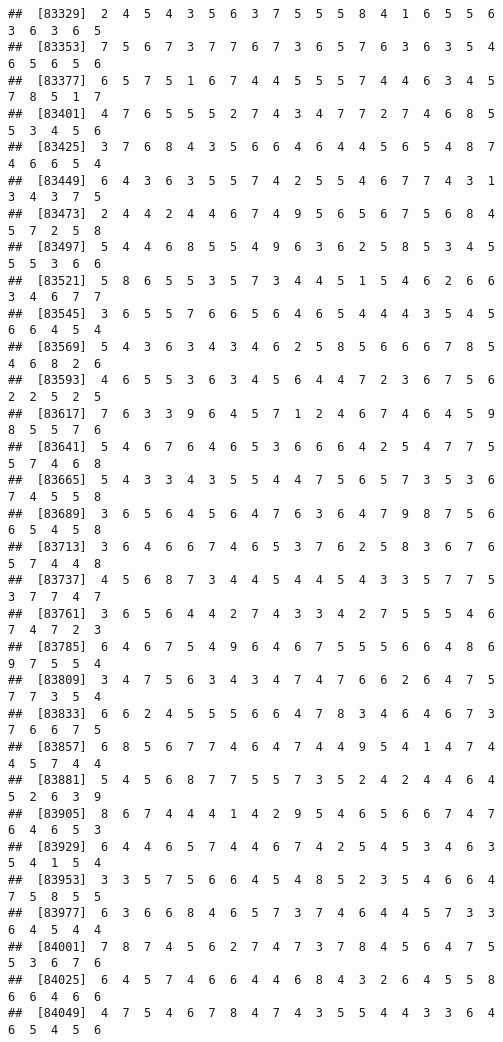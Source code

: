 \documentclass[
]{book}
\begin{document}
\begin{verbatim}
##  [83329]  2  4  5  4  3  5  6  3  7  5  5  5  8  4  1  6  5  5  6  3  6  3  6  5
##  [83353]  7  5  6  7  3  7  7  6  7  3  6  5  7  6  3  6  3  5  4  6  5  6  5  6
##  [83377]  6  5  7  5  1  6  7  4  4  5  5  5  7  4  4  6  3  4  5  7  8  5  1  7
##  [83401]  4  7  6  5  5  5  2  7  4  3  4  7  7  2  7  4  6  8  5  5  3  4  5  6
##  [83425]  3  7  6  8  4  3  5  6  6  4  6  4  4  5  6  5  4  8  7  4  6  6  5  4
##  [83449]  6  4  3  6  3  5  5  7  4  2  5  5  4  6  7  7  4  3  1  3  4  3  7  5
##  [83473]  2  4  4  2  4  4  6  7  4  9  5  6  5  6  7  5  6  8  4  5  7  2  5  8
##  [83497]  5  4  4  6  8  5  5  4  9  6  3  6  2  5  8  5  3  4  5  5  5  3  6  6
##  [83521]  5  8  6  5  5  3  5  7  3  4  4  5  1  5  4  6  2  6  6  3  4  6  7  7
##  [83545]  3  6  5  5  7  6  6  5  6  4  6  5  4  4  4  3  5  4  5  6  6  4  5  4
##  [83569]  5  4  3  6  3  4  3  4  6  2  5  8  5  6  6  6  7  8  5  4  6  8  2  6
##  [83593]  4  6  5  5  3  6  3  4  5  6  4  4  7  2  3  6  7  5  6  2  2  5  2  5
##  [83617]  7  6  3  3  9  6  4  5  7  1  2  4  6  7  4  6  4  5  9  8  5  5  7  6
##  [83641]  5  4  6  7  6  4  6  5  3  6  6  6  4  2  5  4  7  7  5  5  7  4  6  8
##  [83665]  5  4  3  3  4  3  5  5  4  4  7  5  6  5  7  3  5  3  6  7  4  5  5  8
##  [83689]  3  6  5  6  4  5  6  4  7  6  3  6  4  7  9  8  7  5  6  6  5  4  5  8
##  [83713]  3  6  4  6  6  7  4  6  5  3  7  6  2  5  8  3  6  7  6  5  7  4  4  8
##  [83737]  4  5  6  8  7  3  4  4  5  4  4  5  4  3  3  5  7  7  5  3  7  7  4  7
##  [83761]  3  6  5  6  4  4  2  7  4  3  3  4  2  7  5  5  5  4  6  7  4  7  2  3
##  [83785]  6  4  6  7  5  4  9  6  4  6  7  5  5  5  6  6  4  8  6  9  7  5  5  4
##  [83809]  3  4  7  5  6  3  4  3  4  7  4  7  6  6  2  6  4  7  5  7  7  3  5  4
##  [83833]  6  6  2  4  5  5  5  6  6  4  7  8  3  4  6  4  6  7  3  7  6  6  7  5
##  [83857]  6  8  5  6  7  7  4  6  4  7  4  4  9  5  4  1  4  7  4  4  5  7  4  4
##  [83881]  5  4  5  6  8  7  7  5  5  7  3  5  2  4  2  4  4  6  4  5  2  6  3  9
##  [83905]  8  6  7  4  4  4  1  4  2  9  5  4  6  5  6  6  7  4  7  6  4  6  5  3
##  [83929]  6  4  4  6  5  7  4  4  6  7  4  2  5  4  5  3  4  6  3  5  4  1  5  4
##  [83953]  3  3  5  7  5  6  6  4  5  4  8  5  2  3  5  4  6  6  4  7  5  8  5  5
##  [83977]  6  3  6  6  8  4  6  5  7  3  7  4  6  4  4  5  7  3  3  6  4  5  4  4
##  [84001]  7  8  7  4  5  6  2  7  4  7  3  7  8  4  5  6  4  7  5  5  3  6  7  6
##  [84025]  6  4  5  7  4  6  6  4  4  6  8  4  3  2  6  4  5  5  8  6  6  4  6  6
##  [84049]  4  7  5  4  6  7  8  4  7  4  3  5  5  4  4  3  3  6  4  6  5  4  5  6

\end{verbatim}
\end{document}
